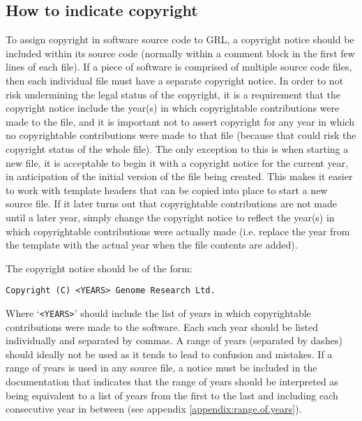 \documentclass[10pt,a4paper]{article}
\begin{document}
\subsection{How to indicate copyright}
\label{section:impnotes.copyright}
\par To assign copyright in software source code to GRL, a copyright notice should 
be included within its source code (normally within a comment block in the first 
few lines of each file). If a piece of software is comprised of multiple source code 
files, then each individual file must have a separate copyright notice. In order to 
not risk undermining the legal status of the copyright, it is a requirement that the 
copyright notice include the year(s) in which copyrightable contributions were 
made to the file, and it is important not to assert copyright for any year in which 
no copyrightable contributions were made to that file (because that could risk the 
copyright status of the whole file). The only exception to this is when starting a 
new file, it is acceptable to begin it with a copyright notice for the current year, in 
anticipation of the initial version of the file being created. This makes it easier to 
work with template headers that can be copied into place to start a new source 
file. If it later turns out that copyrightable contributions are not made until 
a later year, simply change the copyright notice to reflect the year(s) in which 
copyrightable contributions were actually made (i.e. replace the year from the 
template with the actual year when the file contents are added). 

\par The copyright notice should be of the form: 
\begin{verbatim}
Copyright (C) <YEARS> Genome Research Ltd.
\end{verbatim}

\par Where `\texttt{<YEARS>}' should include the list of years in which copyrightable 
contributions were made to the software. Each such year should be listed individually 
and separated by commas. A range of years (separated by dashes) should ideally 
not be used as it tends to lead to confusion and mistakes. If a range of years is used 
in any source file, a notice must be included in the documentation that indicates that 
the range of years should be interpreted as being equivalent to a list of years from the 
first to the last and including each consecutive year in between 
(see appendix \ref{appendix:range.of.years}). 
\end{document}
